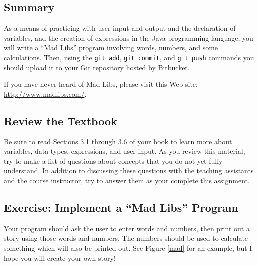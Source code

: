 



\subsection*{Summary}

As a means of practicing with user input and output and the declaration of variables, and the creation of expressions in
the Java programming language, you will write a ``Mad Libs'' program involving words, numbers, and some calculations.
Then, using the {\tt git add}, {\tt git commit}, and {\tt git push} commands you should upload it to your Git repository
hosted by Bitbucket.  

\noindent
If you have never heard of Mad Libs, please visit this Web site: \url{http://www.madlibs.com/}. 

\subsection*{Review the Textbook}

Be sure to read Sections 3.1 through 3.6 of your book to learn more about variables, data types, expressions, and user
input.  As you review this material, try to make a list of questions about concepts that you do not yet fully
understand.  In addition to discussing these questions with the teaching assistants and the course instructor, try to
answer them as your complete this assignment.

\subsection*{Exercise: Implement a ``Mad Libs'' Program} 

Your program should ask the user to enter words and numbers, then print out a story using those words and numbers. The
numbers should be used to calculate something which will also be printed out. See Figure \ref{mad} for an example, but I
hope you will create your own story!

